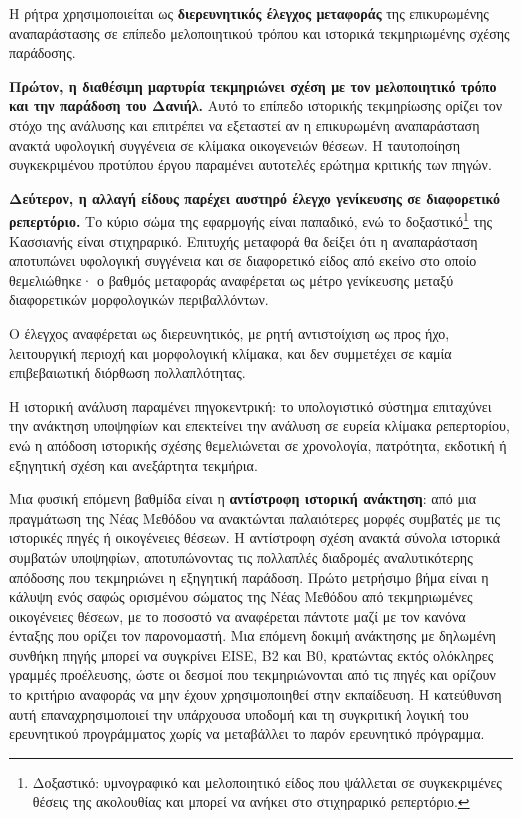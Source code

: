\documentclass[11pt,a4paper]{article}
\begin{document}
Η ρήτρα χρησιμοποιείται ως \textbf{διερευνητικός έλεγχος μεταφοράς} της επικυρωμένης αναπαράστασης σε επίπεδο μελοποιητικού τρόπου και ιστορικά τεκμηριωμένης σχέσης παράδοσης.

\textbf{Πρώτον, η διαθέσιμη μαρτυρία τεκμηριώνει σχέση με τον μελοποιητικό τρόπο και την παράδοση του Δανιήλ.} Αυτό το επίπεδο ιστορικής τεκμηρίωσης ορίζει τον στόχο της ανάλυσης και επιτρέπει να εξεταστεί αν η επικυρωμένη αναπαράσταση ανακτά υφολογική συγγένεια σε κλίμακα οικογενειών θέσεων. Η ταυτοποίηση συγκεκριμένου προτύπου έργου παραμένει αυτοτελές ερώτημα κριτικής των πηγών.

\textbf{Δεύτερον, η αλλαγή είδους παρέχει αυστηρό έλεγχο γενίκευσης σε διαφορετικό ρεπερτόριο.} Το κύριο σώμα της εφαρμογής είναι παπαδικό, ενώ το δοξαστικό\footnote{Δοξαστικό: υμνογραφικό και μελοποιητικό είδος που ψάλλεται σε συγκεκριμένες θέσεις της ακολουθίας και μπορεί να ανήκει στο στιχηραρικό ρεπερτόριο.} της Κασσιανής είναι στιχηραρικό. Επιτυχής μεταφορά θα δείξει ότι η αναπαράσταση αποτυπώνει υφολογική συγγένεια και σε διαφορετικό είδος από εκείνο στο οποίο θεμελιώθηκε· ο βαθμός μεταφοράς αναφέρεται ως μέτρο γενίκευσης μεταξύ διαφορετικών μορφολογικών περιβαλλόντων.

Ο έλεγχος αναφέρεται ως διερευνητικός, με ρητή αντιστοίχιση ως προς ήχο, λειτουργική περιοχή και μορφολογική κλίμακα, και δεν συμμετέχει σε καμία επιβεβαιωτική διόρθωση πολλαπλότητας.

Η ιστορική ανάλυση παραμένει πηγοκεντρική: το υπολογιστικό σύστημα επιταχύνει την ανάκτηση υποψηφίων και επεκτείνει την ανάλυση σε ευρεία κλίμακα ρεπερτορίου, ενώ η απόδοση ιστορικής σχέσης θεμελιώνεται σε χρονολογία, πατρότητα, εκδοτική ή εξηγητική σχέση και ανεξάρτητα τεκμήρια.

Μια φυσική επόμενη βαθμίδα είναι η \textbf{αντίστροφη ιστορική ανάκτηση}: από μια πραγμάτωση της Νέας Μεθόδου να ανακτώνται παλαιότερες μορφές συμβατές με τις ιστορικές πηγές ή οικογένειες θέσεων. Η αντίστροφη σχέση ανακτά σύνολα ιστορικά συμβατών υποψηφίων, αποτυπώνοντας τις πολλαπλές διαδρομές αναλυτικότερης απόδοσης που τεκμηριώνει η εξηγητική παράδοση. Πρώτο μετρήσιμο βήμα είναι η κάλυψη ενός σαφώς ορισμένου σώματος της Νέας Μεθόδου από τεκμηριωμένες οικογένειες θέσεων, με το ποσοστό να αναφέρεται πάντοτε μαζί με τον κανόνα ένταξης που ορίζει τον παρονομαστή. Μια επόμενη δοκιμή ανάκτησης με δηλωμένη συνθήκη πηγής μπορεί να συγκρίνει EISE, B2 και B0, κρατώντας εκτός ολόκληρες γραμμές προέλευσης, ώστε οι δεσμοί που τεκμηριώνονται από τις πηγές και ορίζουν το κριτήριο αναφοράς να μην έχουν χρησιμοποιηθεί στην εκπαίδευση. Η κατεύθυνση αυτή επαναχρησιμοποιεί την υπάρχουσα υποδομή και τη συγκριτική λογική του ερευνητικού προγράμματος χωρίς να μεταβάλλει το παρόν ερευνητικό πρόγραμμα.
\end{document}
